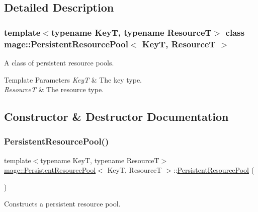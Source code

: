 \subsection{Detailed Description}
\subsubsection*{template$<$typename KeyT, typename ResourceT$>$\newline
class mage\+::\+Persistent\+Resource\+Pool$<$ Key\+T, Resource\+T $>$}

A class of persistent resource pools.


\begin{DoxyTemplParams}{Template Parameters}
{\em KeyT} & The key type. \\
\hline
{\em ResourceT} & The resource type. \\
\hline
\end{DoxyTemplParams}


\subsection{Constructor \& Destructor Documentation}
\hypertarget{classmage_1_1_persistent_resource_pool_a23b83adf594628b93c368a2da7660ef8}{}\label{classmage_1_1_persistent_resource_pool_a23b83adf594628b93c368a2da7660ef8} 
\subsubsection{\texorpdfstring{Persistent\+Resource\+Pool()}{PersistentResourcePool()}\hspace{0.1cm}{\footnotesize\ttfamily [1/3]}}
{\footnotesize\ttfamily template$<$typename KeyT, typename ResourceT$>$ \\
\hyperlink{classmage_1_1_persistent_resource_pool}{mage\+::\+Persistent\+Resource\+Pool}$<$ KeyT, ResourceT $>$\+::\hyperlink{classmage_1_1_persistent_resource_pool}{Persistent\+Resource\+Pool} (\begin{DoxyParamCaption}{ }\end{DoxyParamCaption})\hspace{0.3cm}{\ttfamily [default]}}

Constructs a persistent resource pool. \hypertarget{classmage_1_1_persistent_resource_pool_aca217be62dbc93e4c6241defbfc454ff}{}\label{classmage_1_1_persistent_resource_pool_aca217be62dbc93e4c6241defbfc454ff} 
